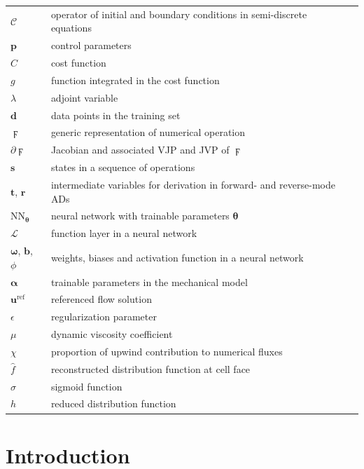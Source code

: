 \documentclass[preprint,3p,12pt,sort&compress]{elsarticle}
\begin{document}
\begin{table}
\begin{tabular*}{16cm}{lll}
        $\mathcal C$ & operator of initial and boundary conditions in semi-discrete equations \\
        $\mathbf p$ & control parameters \\
        $C$ & cost function \\
        $g$ & function integrated in the cost function \\
        $\lambda$ & adjoint variable \\
        $\mathbf d$ & data points in the training set \\
        $\digamma$ & generic representation of numerical operation \\
        $\partial\digamma$ & Jacobian and associated VJP and JVP of $\digamma$ \\
        $\mathbf s$ & states in a sequence of operations \\
        $\mathbf t$, $\mathbf r$ & intermediate variables for derivation in forward- and reverse-mode ADs \\
        $\mathrm{NN}_{\boldsymbol\theta}$ & neural network with trainable parameters $\boldsymbol\theta$ \\
        $\mathcal L$ & function layer in a neural network \\
        $\boldsymbol\omega$, $\mathbf b$, $\phi$ & weights, biases and activation function in a neural network \\
        $\boldsymbol\alpha$ & trainable parameters in the mechanical model \\
        $\mathbf u^\mathrm{ref}$ & referenced flow solution \\
        $\epsilon$ & regularization parameter \\
        $\mu$ & dynamic viscosity coefficient \\
        $\chi$ & proportion of upwind contribution to numerical fluxes \\
        $\hat f$ & reconstructed distribution function at cell face \\
        $\sigma$ & sigmoid function \\
        $h$ & reduced distribution function \\
        \hline
    \end{tabular*}
    \label{table:nomenclature}
\end{table}
\newpage

\section{Introduction}
\end{document}
